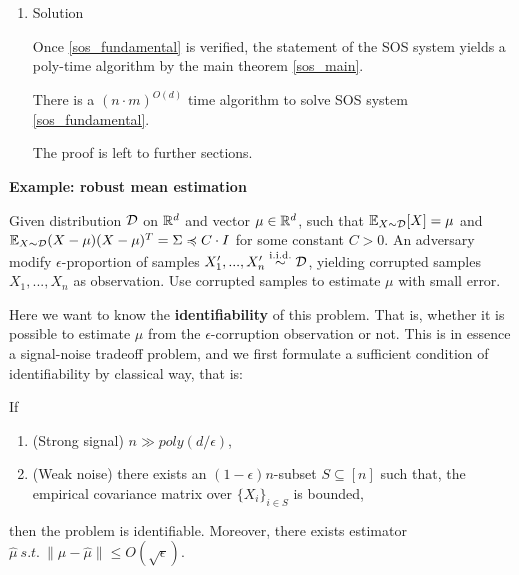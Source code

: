 \begin{enumerate}
    \item Solution
    
    Once \eqref{sos_fundamental} is verified, the statement of the SOS system yields a poly-time algorithm by the main theorem \ref{sos_main}.
    
    \begin{thm}
    \label{sos_main}
        There is a $(n\cdot m)^{O(d)}$ time algorithm to solve SOS system \eqref{sos_fundamental}.
    \end{thm}
    
    The proof is left to further sections.

   

\end{enumerate}

\bigskip



\textbf{Example: robust mean estimation}

\begin{prob}
\label{robust_mean_prob}
Given distribution $\mathcal{D}$ on $\mathbb{R}^d$ and vector $\mu\in\mathbb{R}^d$, such that
$\mathbb{E}_{X\sim\mathcal{D}}[X]=\mu$ and $\mathbb{E}_{X\sim\mathcal{D}}(X-\mu)(X-\mu)^T=\Sigma\preccurlyeq C\cdot I$ for some constant $C>0$. 
An adversary modify $\epsilon$-proportion of samples $X_1',...,X_n'\stackrel{\mathrm{i.i.d.}}{\sim}\mathcal{D}$, yielding corrupted samples $X_1,...,X_n$ as observation.
Use corrupted samples to estimate $\mu$ with small error. 
\end{prob}

Here we want to know the \textbf{identifiability} of this problem. 
That is, whether it is possible to estimate $\mu$ from the $\epsilon$-corruption observation or not. 
This is in essence a signal-noise tradeoff problem, and
we first formulate a sufficient condition of identifiability by classical way, that is:

\begin{thm}
    \label{robust_mean_classic_main}
    If \begin{enumerate}
        \item (Strong signal) $n\gg poly(d/\epsilon)$,
        \item (Weak noise) there exists an $(1-\epsilon)n$-subset $S\subseteq[n]$ such that, the empirical covariance matrix over $\{X_i\}_{i\in S}$ is bounded,
    \end{enumerate}
    then the problem is identifiable. Moreover, there exists estimator $\hat{\mu}~s.t.~\|\mu-\hat{\mu}\|\le O(\sqrt{\epsilon})$.
\end{thm}

